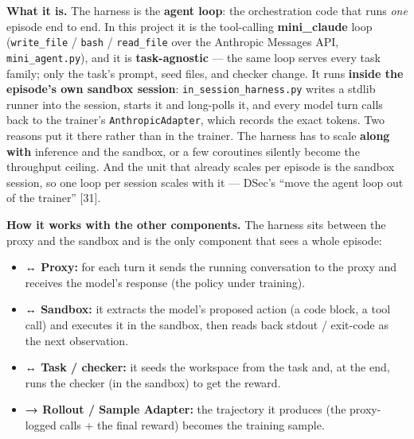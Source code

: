 \documentclass[
  paper=a4,
  ,captions=tableheading
]{scrartcl}
\providecommand{\tightlist}{%
  \setlength{\itemsep}{0pt}\setlength{\parskip}{0pt}}
\begin{document}
\textbf{What it is.} The harness is the \textbf{agent loop}: the
orchestration code that runs \emph{one} episode end to end. In this
project it is the tool-calling \textbf{mini\_claude} loop
(\texttt{write\_file} / \texttt{bash} / \texttt{read\_file} over the
Anthropic Messages API, \texttt{mini\_agent.py}), and it is
\textbf{task-agnostic} --- the same loop serves every task family; only
the task's prompt, seed files, and checker change. It runs
\textbf{inside the episode's own sandbox session}:
\texttt{in\_session\_harness.py} writes a stdlib runner into the
session, starts it and long-polls it, and every model turn calls back to
the trainer's \texttt{AnthropicAdapter}, which records the exact tokens.
Two reasons put it there rather than in the trainer. The harness has to
scale \textbf{along with} inference and the sandbox, or a few coroutines
silently become the throughput ceiling. And the unit that already scales
per episode is the sandbox session, so one loop per session scales with
it --- DSec's ``move the agent loop out of the trainer'' {[}31{]}.

\textbf{How it works with the other components.} The harness sits
between the proxy and the sandbox and is the only component that sees a
whole episode:

\begin{itemize}
\tightlist
\item
  \textbf{↔ Proxy:} for each turn it sends the running conversation to
  the proxy and receives the model's response (the policy under
  training).
\item
  \textbf{↔ Sandbox:} it extracts the model's proposed action (a code
  block, a tool call) and executes it in the sandbox, then reads back
  stdout / exit-code as the next observation.
\item
  \textbf{↔ Task / checker:} it seeds the workspace from the task and,
  at the end, runs the checker (in the sandbox) to get the reward.
\item
  \textbf{→ Rollout / Sample Adapter:} the trajectory it produces (the
  proxy-logged calls + the final reward) becomes the training sample.
\end{itemize}
\end{document}
